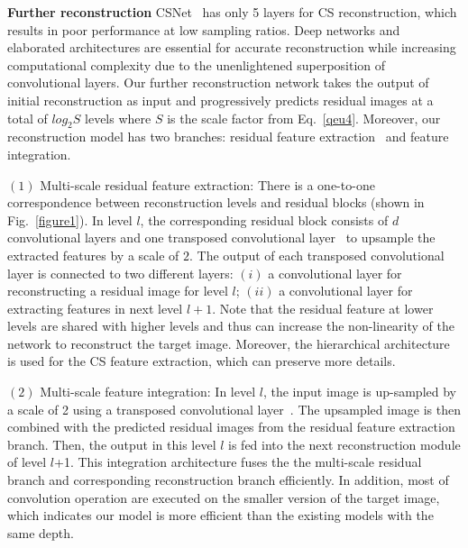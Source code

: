 \documentclass{article}
\begin{document}
\textbf{Further reconstruction}
CSNet~\cite{shi2017deep} has only 5 layers for CS reconstruction, which results in poor performance at low sampling ratios. Deep networks and elaborated architectures are essential for accurate reconstruction while increasing computational complexity due to the unenlightened superposition of convolutional layers. Our further reconstruction network takes the output of initial reconstruction as input and progressively predicts residual images at a total of $log_{2}S$ levels where $S$ is the scale factor from Eq.~\ref{qeu4}. Moreover, our reconstruction model has two branches: residual feature extraction~\cite{he2016deep} and feature integration.

$(1)$ Multi-scale residual feature extraction: There is a one-to-one correspondence between reconstruction levels and residual blocks (shown in Fig.~\ref{figure1}). In level $l$, the corresponding residual block consists of $d$ convolutional layers and one transposed convolutional layer~\cite{dumoulin2016guide} to upsample the extracted features by a scale of $2$. The output of each transposed convolutional layer is connected to two different layers: $(i)$ a convolutional layer for reconstructing a residual image for level $l$; $(ii)$ a convolutional layer for extracting features in next level $l+1$. Note that the residual feature at lower levels are shared with higher levels and thus can increase the non-linearity of the network to reconstruct the target image. Moreover, the hierarchical architecture is used for the CS feature extraction, which can preserve more details.

$(2)$ Multi-scale feature integration: In level $l$, the input image is up-sampled by a scale of 2 using a transposed convolutional layer~\cite{dumoulin2016guide}. The upsampled image is then combined with the predicted residual images from the residual feature extraction branch. Then, the output in this level $l$ is fed into the next reconstruction module of level $l$+1. This integration architecture fuses the the multi-scale residual branch and corresponding reconstruction branch efficiently. In addition, most of convolution operation are executed on the smaller version of the target image, which indicates our model is more efficient than the existing models with the same depth.
\end{document}
